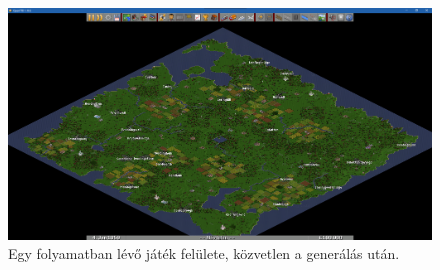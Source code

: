 \begin{figure}
	\centering
	\includegraphics[scale=0.3]{images/palya.png}
	\caption{Egy folyamatban lévő játék felülete, közvetlen a generálás után.}
	\label{fig:palya}
\end{figure}

